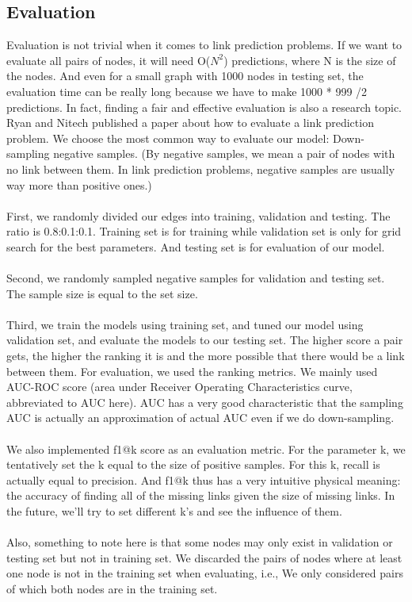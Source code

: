 \documentclass[12pt]{article}
\begin{document}
\subsection{Evaluation}
Evaluation is not trivial when it comes to link prediction problems. If we want to evaluate all pairs of nodes, it will need O($N^2$) predictions, where N is the size of the nodes. And even for a small graph with 1000 nodes in testing set, the evaluation time can be really long because we have to make 1000 * 999 /2 predictions. In fact, finding a fair and effective evaluation is also a research topic. Ryan and Nitech published a paper \cite{eval} about how to evaluate a link prediction problem. We choose the most common way to evaluate our model: Down-sampling negative samples. (By negative samples, we mean a pair of nodes with no link between them. In link prediction problems, negative samples are usually way more than positive ones.)
\\
\\
First, we randomly divided our edges into training, validation and testing. The ratio is 0.8:0.1:0.1. Training set is for training while validation set is only for grid search for the best parameters. And testing set is for evaluation of our model. 
\\
\\
Second, we randomly sampled negative samples for validation and testing set. The sample size is equal to the set size.
\\
\\
Third, we train the models using training set, and tuned our model using validation set, and evaluate the models to our testing set. The higher score a pair gets, the higher the ranking it is and the more possible that there would be a link between them. For evaluation, we used the ranking metrics. We mainly used AUC-ROC score (area under Receiver Operating Characteristics curve, abbreviated to AUC here). AUC has a very good characteristic that the sampling AUC is actually an approximation of actual AUC even if we do down-sampling. 
\\
\\
We also implemented f1@k score as an evaluation metric. For the parameter k, we tentatively set the k equal to the size of positive samples. For this k, recall is actually equal to precision. And f1@k thus has a very intuitive physical meaning: the accuracy of finding all of the missing links given the size of missing links. In the future, we'll try to set different k's and see the influence of them. 
\\
\\
Also, something to note here is that some nodes may only exist in validation or testing set but not in training set. We discarded the pairs of nodes where at least one node is not in the training set when evaluating, i.e., We only considered pairs of which both nodes are in the training set.
\end{document}
